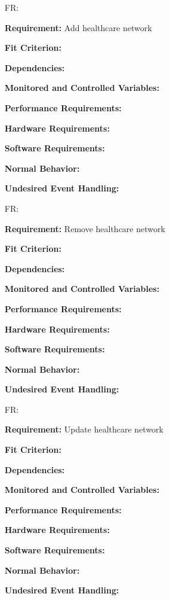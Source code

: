 \documentclass[12pt]{article}
\newcounter{reqnum} %
\begin{document}
\noindent \begin{itemize}

\item[FR\refstepcounter{reqnum}\thereqnum \label{FR_meaningfulLabel}:] 

\textbf{Requirement:} Add healthcare network

\textbf{Fit Criterion:}  

\textbf{Dependencies:}  

\textbf{Monitored and Controlled Variables:} 

\textbf{Performance Requirements:} 

\textbf{Hardware Requirements:} 

\textbf{Software Requirements:} 

\textbf{Normal Behavior:} 

\textbf{Undesired Event Handling:} 


\item[FR\refstepcounter{reqnum}\thereqnum \label{FR_meaningfulLabel}:]  

\textbf{Requirement:} Remove healthcare network 

\textbf{Fit Criterion:}  

\textbf{Dependencies:}  

\textbf{Monitored and Controlled Variables:} 

\textbf{Performance Requirements:} 

\textbf{Hardware Requirements:} 

\textbf{Software Requirements:} 

\textbf{Normal Behavior:} 

\textbf{Undesired Event Handling:} 

\item[FR\refstepcounter{reqnum}\thereqnum \label{FR_meaningfulLabel}:] 

\textbf{Requirement:} Update healthcare network

\textbf{Fit Criterion:}  

\textbf{Dependencies:}  

\textbf{Monitored and Controlled Variables:} 

\textbf{Performance Requirements:} 

\textbf{Hardware Requirements:} 

\textbf{Software Requirements:} 

\textbf{Normal Behavior:} 

\textbf{Undesired Event Handling:} 


\end{itemize}
\end{document}
